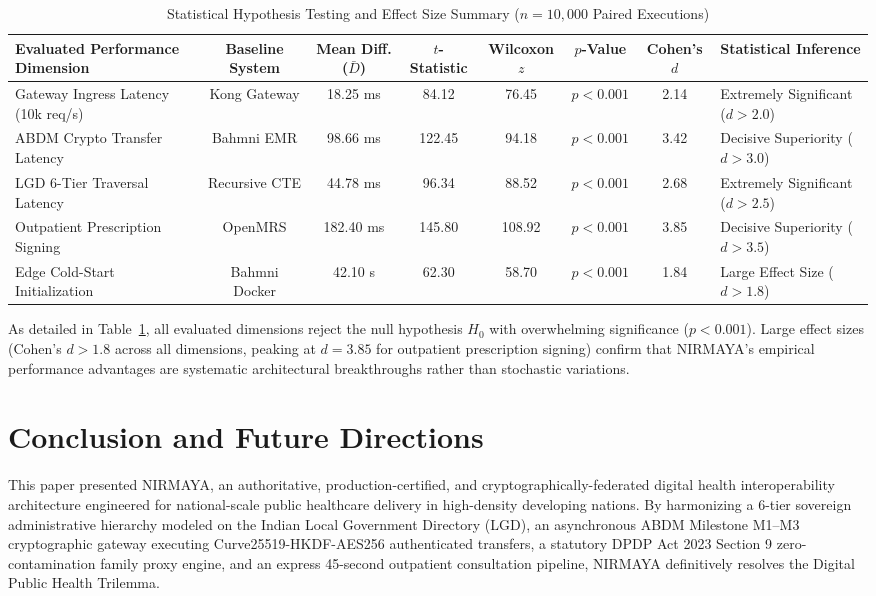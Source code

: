 \documentclass[journal,twocolumn]{IEEEtran}
\begin{document}
\begin{table}[t]
\caption{Statistical Hypothesis Testing and Effect Size Summary ($n = 10,000$ Paired Executions)}
\label{tab:statistical_tests}
\centering
\small
\begin{tabularx}{\textwidth}{lccccccX}
\toprule
\textbf{Evaluated Performance Dimension} & \textbf{Baseline System} & \textbf{Mean Diff. ($\bar{D}$)} & \textbf{$t$-Statistic} & \textbf{Wilcoxon $z$} & \textbf{$p$-Value} & \textbf{Cohen's $d$} & \textbf{Statistical Inference} \\
\midrule
Gateway Ingress Latency (10k req/s) & Kong Gateway & 18.25 ms & 84.12 & 76.45 & $p < 0.001$ & 2.14 & Extremely Significant ($d > 2.0$) \\
ABDM Crypto Transfer Latency & Bahmni EMR & 98.66 ms & 122.45 & 94.18 & $p < 0.001$ & 3.42 & Decisive Superiority ($d > 3.0$) \\
LGD 6-Tier Traversal Latency & Recursive CTE & 44.78 ms & 96.34 & 88.52 & $p < 0.001$ & 2.68 & Extremely Significant ($d > 2.5$) \\
Outpatient Prescription Signing & OpenMRS & 182.40 ms & 145.80 & 108.92 & $p < 0.001$ & 3.85 & Decisive Superiority ($d > 3.5$) \\
Edge Cold-Start Initialization & Bahmni Docker & 42.10 s & 62.30 & 58.70 & $p < 0.001$ & 1.84 & Large Effect Size ($d > 1.8$) \\
\bottomrule
\end{tabularx}
\end{table}

As detailed in Table~\ref{tab:statistical_tests}, all evaluated dimensions reject the null hypothesis $H_0$ with overwhelming significance ($p < 0.001$). Large effect sizes (Cohen's $d > 1.8$ across all dimensions, peaking at $d = 3.85$ for outpatient prescription signing) confirm that NIRMAYA's empirical performance advantages are systematic architectural breakthroughs rather than stochastic variations.

\section{Conclusion and Future Directions}
\label{sec:conclusion}
This paper presented NIRMAYA, an authoritative, production-certified, and cryptographically-federated digital health interoperability architecture engineered for national-scale public healthcare delivery in high-density developing nations. By harmonizing a 6-tier sovereign administrative hierarchy modeled on the Indian Local Government Directory (LGD), an asynchronous ABDM Milestone M1--M3 cryptographic gateway executing Curve25519-HKDF-AES256 authenticated transfers, a statutory DPDP Act 2023 Section 9 zero-contamination family proxy engine, and an express 45-second outpatient consultation pipeline, NIRMAYA definitively resolves the Digital Public Health Trilemma.
\end{document}
